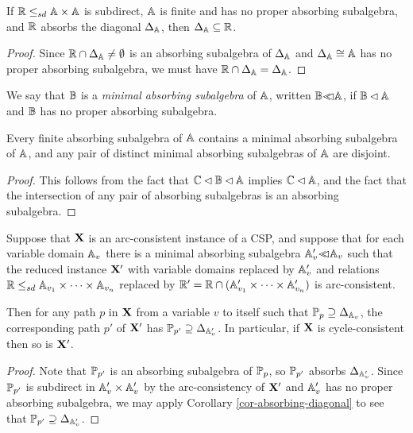 \documentclass[letterpaper,11pt]{article}
\begin{document}
\begin{cor}\label{cor-absorbing-diagonal} If $\mathbb{R} \le_{sd} \mathbb{A}\times \mathbb{A}$ is subdirect, $\mathbb{A}$ is finite and has no proper absorbing subalgebra, and $\mathbb{R}$ absorbs the diagonal $\Delta_{\mathbb{A}}$, then $\Delta_{\mathbb{A}} \subseteq \mathbb{R}$.
\end{cor}
\begin{proof} Since $\mathbb{R} \cap \Delta_{\mathbb{A}} \ne \emptyset$ is an absorbing subalgebra of $\Delta_{\mathbb{A}}$ and $\Delta_{\mathbb{A}} \cong \mathbb{A}$ has no proper absorbing subalgebra, we must have $\mathbb{R} \cap \Delta_{\mathbb{A}} = \Delta_{\mathbb{A}}$.
\end{proof}

\begin{defn} We say that $\mathbb{B}$ is a \emph{minimal absorbing subalgebra} of $\mathbb{A}$, written $\bB \llhd \bA$, if $\mathbb{B} \lhd \mathbb{A}$ and $\mathbb{B}$ has no proper absorbing subalgebra.
\end{defn}

\begin{prop} Every finite absorbing subalgebra of $\mathbb{A}$ contains a minimal absorbing subalgebra of $\mathbb{A}$, and any pair of distinct minimal absorbing subalgebras of $\mathbb{A}$ are disjoint.
\end{prop}
\begin{proof} This follows from the fact that $\mathbb{C} \lhd \mathbb{B} \lhd \mathbb{A}$ implies $\mathbb{C} \lhd \mathbb{A}$, and the fact that the intersection of any pair of absorbing subalgebras is an absorbing subalgebra.
\end{proof}

\begin{thm}\label{arc-consistent-cycles} Suppose that $\mathbf{X}$ is an arc-consistent instance of a CSP, and suppose that for each variable domain $\mathbb{A}_v$ there is a minimal absorbing subalgebra $\bA_v' \llhd \bA_v$ such that the reduced instance $\mathbf{X}'$ with variable domains replaced by $\mathbb{A}_v'$ and relations $\mathbb{R} \le_{sd} \mathbb{A}_{v_1} \times \cdots \times \mathbb{A}_{v_n}$ replaced by $\mathbb{R}' = \mathbb{R} \cap (\mathbb{A}_{v_1}' \times \cdots \times \mathbb{A}_{v_n}')$ is arc-consistent.

Then for any path $p$ in $\mathbf{X}$ from a variable $v$ to itself such that $\mathbb{P}_p \supseteq \Delta_{\mathbb{A}_v}$, the corresponding path $p'$ of $\mathbf{X}'$ has $\mathbb{P}_{p'} \supseteq \Delta_{\mathbb{A}_v'}$. In particular, if $\mathbf{X}$ is cycle-consistent then so is $\mathbf{X}'$.
\end{thm}
\begin{proof} Note that $\mathbb{P}_{p'}$ is an absorbing subalgebra of $\mathbb{P}_p$, so $\mathbb{P}_{p'}$ absorbs $\Delta_{\mathbb{A}_v'}$. Since $\mathbb{P}_{p'}$ is subdirect in $\mathbb{A}_v' \times \mathbb{A}_v'$ by the arc-consistency of $\mathbf{X}'$ and $\mathbb{A}_v'$ has no proper absorbing subalgebra, we may apply Corollary \ref{cor-absorbing-diagonal} to see that $\mathbb{P}_{p'} \supseteq \Delta_{\mathbb{A}_v'}$.
\end{proof}
\end{document}
